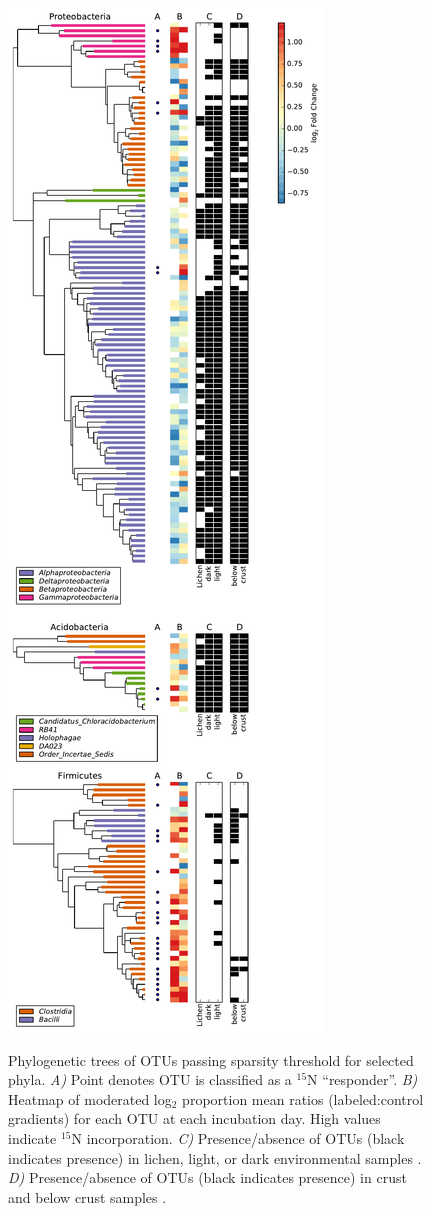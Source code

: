 \begin{figure}[H]
  \centering
  \caption{Phylogenetic trees of OTUs passing sparsity threshold for selected
  phyla. \textit{A)} Point denotes OTU is classified as a $^{15}$N
  ``responder''. \textit{B)} Heatmap of moderated log$_{2}$ proportion mean
  ratios (labeled:control gradients) for each OTU at each incubation day. High
  values indicate $^{15}$N incorporation.  \textit{C)} Presence/absence of OTUs
  (black indicates presence) in lichen, light, or dark environmental samples
  \citep{Garcia_Pichel_2013}. \textit{D)} Presence/absence of OTUs (black
  indicates presence) in crust and below crust samples \citep{Steven_2013}.}
  \includegraphics[height=0.95\textheight]{figures/trees/trees.pdf}
    \label{fig:trees}
\end{figure}

